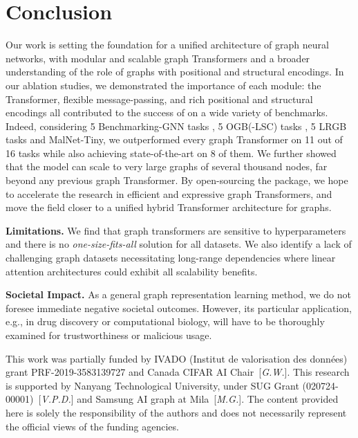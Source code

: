 \documentclass{article}
\begin{document}
\section{Conclusion}\label{sec:conclusion}
\vspace{-3pt}
Our work is setting the foundation for a unified architecture of graph neural networks, with modular and scalable graph Transformers and a broader understanding of the role of graphs with positional and structural encodings. In our ablation studies, we demonstrated the importance of each module: the Transformer, flexible message-passing, and rich positional and structural encodings all contributed to the success of \method on a wide variety of benchmarks. Indeed, considering 5 Benchmarking-GNN tasks \cite{dwivedi2020benchmarking}, 5 OGB(-LSC) tasks \cite{hu2020ogb,hu2021ogblsc}, 5 LRGB tasks \cite{dwivedi2022LRGB} and MalNet-Tiny, we outperformed every graph Transformer on 11 out of 16 tasks while also achieving state-of-the-art on 8 of them. We further showed that the model can scale to very large graphs of several thousand nodes, far beyond any previous graph Transformer. By open-sourcing the \gtgym package, we hope to accelerate the research in efficient and expressive graph Transformers, and move the field closer to a unified hybrid Transformer architecture for graphs.

\textbf{Limitations.} We find that graph transformers are sensitive to hyperparameters and there is no \emph{one-size-fits-all} solution for all datasets. We also identify a lack of challenging graph datasets necessitating long-range dependencies where linear attention architectures could exhibit all scalability benefits. 

\textbf{Societal Impact.} As a general graph representation learning method, we do not foresee immediate negative societal outcomes. However, its particular application, e.g., in drug discovery or computational biology, will have to be thoroughly examined for trustworthiness or malicious usage.


\begin{ack}
This work was partially funded by IVADO (Institut de valorisation des données) grant PRF-2019-3583139727 and Canada CIFAR AI Chair~[\emph{G.W.}]. This research is supported by Nanyang Technological University, under SUG Grant (020724-00001)~[\emph{V.P.D.}] and Samsung AI graph at Mila~[\emph{M.G.}]. The content provided here is solely the responsibility of the authors and does not necessarily represent the official views of the funding agencies.
\end{ack}
\end{document}
